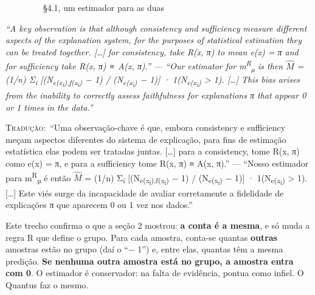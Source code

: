 \documentclass[11pt,a4paper]{article}
\newcommand{\metrictag}[2]{{\setlength{\fboxsep}{1.5pt}%
  \ifstrequal{#1}{c}{\colorbox{cC}{\textcolor{white}{\scriptsize\textbf{#2}}}}{%
  \ifstrequal{#1}{s}{\colorbox{cS}{\textcolor{white}{\scriptsize\textbf{#2}}}}{%
  \colorbox{black!60}{\textcolor{white}{\scriptsize\textbf{#2}}}}}}}
\newcommand{\pagechip}[1]{{\setlength{\fboxsep}{1.5pt}\colorbox{cAcc}{\textcolor{white}{\scriptsize\texttt{#1}}}}}
\newenvironment{origquote}{\par\itshape\small}{\par}
\newenvironment{tradquote}{\par\small\textsc{Tradução:}\ }{\par}
\newcommand{\explab}[1]{\par\smallskip{\small\color{cAcc}\textbf{\MakeUppercase{#1}}}\par}
\begin{document}
\begin{citacard}{\pagechip{p. 10–11} §4.1, um estimador para as duas \metrictag{cs}{C + S}}
\begin{origquote}“A key observation is that although consistency and sufficiency measure different aspects of the explanation system, for the purposes of statistical estimation they can be treated together. […] for consistency, take R(x, π) to mean e(x) = π and for sufficiency take R(x, π) ≡ A(x, π).” — “Our estimator for m\textsuperscript{R}\textsubscript{µ} is then \ensuremath{\hat{M}} = (1/n) Σ\textsubscript{i} [(N\textsubscript{e(x\textsubscript{i}),f(x\textsubscript{i})} − 1) / (N\textsubscript{e(x\textsubscript{i})} − 1)] · 1(N\textsubscript{e(x\textsubscript{i})} > 1). […] This bias arises from the inability to correctly assess faithfulness for explanations π that appear 0 or 1 times in the data.”\end{origquote}
\begin{tradquote}“Uma observação-chave é que, embora consistency e sufficiency meçam aspectos diferentes do sistema de explicação, para fins de estimação estatística elas podem ser tratadas juntas. […] para a consistency, tome R(x, π) como e(x) = π, e para a sufficiency tome R(x, π) ≡ A(x, π).” — “Nosso estimador para m\textsuperscript{R}\textsubscript{µ} é então \ensuremath{\hat{M}} = (1/n) Σ\textsubscript{i} [(N\textsubscript{e(x\textsubscript{i}),f(x\textsubscript{i})} − 1) / (N\textsubscript{e(x\textsubscript{i})} − 1)] · 1(N\textsubscript{e(x\textsubscript{i})} > 1). […] Este viés surge da incapacidade de avaliar corretamente a fidelidade de explicações π que aparecem 0 ou 1 vez nos dados.”\end{tradquote}
\explab{Explicação}
Este trecho confirma o que a seção 2 mostrou: \textbf{a conta é a mesma}, e só muda a regra R que define o grupo. Para cada amostra, conta-se quantas \textbf{outras} amostras estão no grupo (daí o “− 1”) e, entre elas, quantas têm a mesma predição. \textbf{Se nenhuma outra amostra está no grupo, a amostra entra com 0}. O estimador é conservador: na falta de evidência, pontua como infiel. O Quantus faz o mesmo.
\end{citacard}
\end{document}
